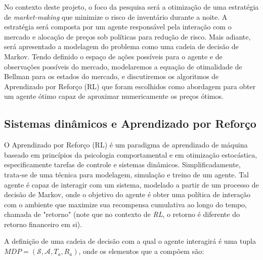 No contexto deste projeto, o foco da pesquisa será a otimização de uma estratégia de \textit{market-making} que minimize o risco de inventário durante a noite. A estratégia será composta por um agente responsável pela interação com o mercado e alocação de preços sob políticas para redução de risco. Mais adiante, será apresentado a modelagem do problema como uma cadeia de decisão de Markov. Tendo definido o espaço de ações possíveis para o agente e de observações possíveis do mercado, modelaremos a equação de otimalidade de Bellman para os estados do mercado, e discutiremos os algoritmos de Aprendizado por Reforço (RL) que foram escolhidos como abordagem para obter um agente ótimo capaz de aproximar numericamente os preços ótimos.

\subsection{Sistemas dinâmicos e Aprendizado por Reforço}
O Aprendizado por Reforço (RL) é um paradigma de aprendizado de máquina baseado em princípios da psicologia comportamental e em otimização estocástica, especificamente tarefas de controle e sistemas dinâmicos. Simplificadamente, trata-se de uma técnica para modelagem, simulação e treino de um agente. Tal agente é capaz de interagir com um sistema, modelado a partir de um processo de decisão de Markov, onde o objetivo do agente é obter uma política de interação com o ambiente que maximize sua recompensa cumulativa ao longo do tempo, chamada de "retorno" (note que no contexto de \textit{RL}, o retorno é diferente do retorno financeiro em si).

A definição de uma cadeia de decisão com a qual o agente interagirá é uma tupla $MDP = (\mathcal{S}, \mathcal{A}, T_{a}, R_{a})$, onde os elementos que a compõem são:

